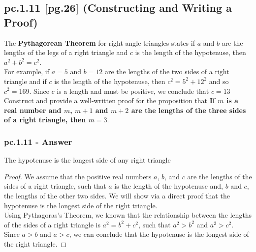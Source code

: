 \newpage
\subsection{pc.1.11 [pg.26] (Constructing and Writing a Proof)}

The {\bf Pythagorean Theorem} for right angle triangles states if $a$ and $b$ are the lengths of the legs of a right triangle and $c$ is the length of the hypotenuse, then $a^2 + b^2 = c^2$. \\
For example, if $a=5$ and $b=12$ are the lengths of the two sides of a right triangle and if $c$ is the length of the hypotenuse, then $c^2 = 5^2 + 12^2$ and so $c^2=169$. Since $c$ is a length and must be positive, we conclude that $c=13$ \\

Construct and provide a well-written proof for the proposition that { \bf If $m$ is a real number and $m$, $m+1$ and $m+2$ are the lengths of the three sides of a right triangle, then $m=3$}.\\ 

\subsubsection*{pc.1.11 - Answer}
\begin{tcolorbox}
	\begin{lemma}
		The hypotenuse is the longest side of any right triangle
	\end{lemma}
\end{tcolorbox}

\begin{proof}

We assume that the positive real numbers $a$, $b$, and $c$ are the lengths of the sides of a right triangle, such that $a$ is the length of the hypotenuse and, $b$ and $c$, the lengths of the other two sides. We will show via a direct proof that the hypotenuse is the longest side of the right triangle. \\

Using Pythagoras's Theorem, we known that the relationship between the lengths of the sides of a right triangle is $a^2 = b^2 + c^2$, such that $a^2 > b^2$ and $a^2 > c^2$. \\ 

Since $a > b$ and $a > c$, we can conclude that the hypotenuse is the longest side of the right triangle. 

\end{proof}

